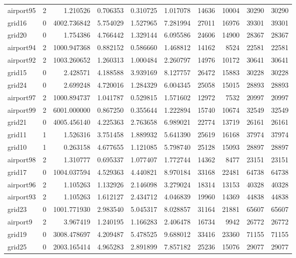 \begin{longtable}{|l|r|r|r|r|r|r|r|r|r|}
airport95 & 2 & 1.210526 & 0.706353 & 0.310725 & 1.017078 & 14636 & 10004 & 30290 & 30290 \\
grid16 & 0 & 4002.736842 & 5.754029 & 1.527965 & 7.281994 & 27011 & 16976 & 39301 & 39301 \\
grid20 & 0 & 1.754386 & 4.766442 & 1.329144 & 6.095586 & 24606 & 14900 & 28367 & 28367 \\
airport94 & 2 & 1000.947368 & 0.882152 & 0.586660 & 1.468812 & 14162 & 8524 & 22581 & 22581 \\
airport92 & 2 & 1003.260652 & 1.260313 & 1.000484 & 2.260797 & 14976 & 10172 & 30641 & 30641 \\
grid15 & 0 & 2.428571 & 4.188588 & 3.939169 & 8.127757 & 26472 & 15883 & 30228 & 30228 \\
grid24 & 0 & 2.699248 & 4.720016 & 1.284329 & 6.004345 & 25058 & 15015 & 28893 & 28893 \\
airport97 & 2 & 1000.894737 & 1.041787 & 0.529815 & 1.571602 & 12972 & 7532 & 20997 & 20997 \\
airport99 & 2 & 6001.000000 & 0.867250 & 0.355644 & 1.222894 & 15740 & 10674 & 32549 & 32549 \\
grid21 & 0 & 4005.456140 & 4.225363 & 2.763658 & 6.989021 & 22774 & 13719 & 26161 & 26161 \\
grid11 & 1 & 1.526316 & 3.751458 & 1.889932 & 5.641390 & 25619 & 16168 & 37974 & 37974 \\
grid10 & 1 & 0.263158 & 4.677655 & 1.121085 & 5.798740 & 25128 & 15093 & 28897 & 28897 \\
airport98 & 2 & 1.310777 & 0.695337 & 1.077407 & 1.772744 & 14362 & 8477 & 23151 & 23151 \\
grid17 & 0 & 1004.037594 & 4.529363 & 4.440821 & 8.970184 & 33168 & 22481 & 64738 & 64738 \\
airport96 & 2 & 1.105263 & 1.132926 & 2.146098 & 3.279024 & 18314 & 13153 & 40328 & 40328 \\
airport93 & 2 & 1.105263 & 1.612127 & 2.434712 & 4.046839 & 19960 & 14369 & 44838 & 44838 \\
grid23 & 0 & 1001.771930 & 2.983540 & 5.045317 & 8.028857 & 31164 & 21881 & 65607 & 65607 \\
airport9 & 2 & 3.967419 & 1.240195 & 1.166283 & 2.406478 & 16734 & 9942 & 26772 & 26772 \\
grid19 & 0 & 3008.478697 & 4.209487 & 5.478525 & 9.688012 & 33416 & 23360 & 71155 & 71155 \\
grid25 & 0 & 2003.165414 & 4.965283 & 2.891899 & 7.857182 & 25236 & 15076 & 29077 & 29077 \\

\end{longtable}
